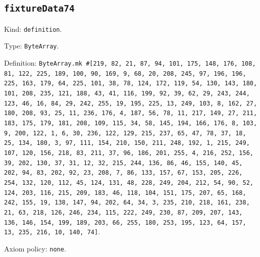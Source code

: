 \documentclass[11pt]{article}
\begin{document}
\subsection*{\texttt{fixtureData74}}
\noindent Kind: \texttt{definition}.\par
\noindent Type: \texttt{ByteArray}.\par
\noindent Definition: \texttt{ByteArray.mk \#[219, 82, 21, 87, 94, 101, 175, 148, 176, 108, 81, 122, 225, 189, 100, 90, 169, 9, 68, 20, 208, 245, 97, 196, 196, 225, 163, 179, 64, 225, 101, 38, 78, 124, 172, 119, 54, 130, 143, 180, 101, 208, 235, 121, 188, 43, 41, 116, 199, 92, 39, 62, 29, 243, 244, 123, 46, 16, 84, 29, 242, 255, 19, 195, 225, 13, 249, 103, 8, 162, 27, 180, 208, 93, 25, 11, 236, 176, 4, 187, 56, 78, 11, 217, 149, 27, 211, 183, 175, 179, 181, 208, 109, 115, 34, 58, 145, 194, 166, 176, 8, 103, 9, 200, 122, 1, 6, 30, 236, 122, 129, 215, 237, 65, 47, 78, 37, 18, 25, 134, 180, 3, 97, 111, 154, 210, 150, 211, 248, 192, 1, 215, 249, 107, 120, 156, 218, 83, 211, 37, 96, 186, 201, 255, 4, 216, 252, 156, 39, 202, 130, 37, 31, 12, 32, 215, 244, 136, 86, 46, 155, 140, 45, 202, 94, 83, 202, 92, 23, 208, 7, 86, 133, 157, 67, 153, 205, 226, 254, 132, 120, 112, 45, 124, 131, 48, 228, 249, 204, 212, 54, 90, 52, 124, 203, 116, 215, 209, 183, 46, 118, 104, 151, 175, 207, 65, 168, 242, 155, 19, 138, 147, 94, 202, 64, 34, 3, 235, 210, 218, 161, 238, 21, 63, 218, 126, 246, 234, 115, 222, 249, 230, 87, 209, 207, 143, 136, 146, 154, 199, 189, 203, 66, 255, 180, 253, 195, 123, 64, 157, 13, 235, 216, 10, 140, 74]}.\par
\noindent Axiom policy: \texttt{none}.\par
\end{document}
